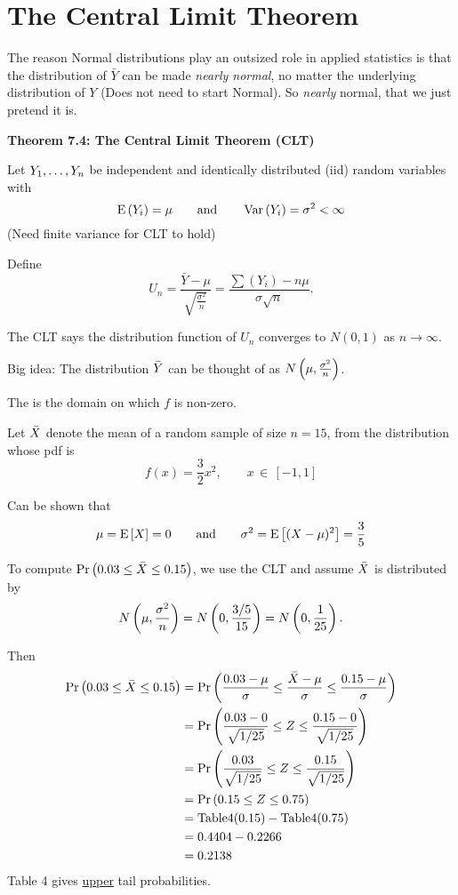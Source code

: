 \section{The Central Limit Theorem}

The reason Normal distributions play an outsized role in applied statistics is that the distribution of  $\bar{Y}$ can be made \emph{nearly normal}, no matter the underlying distribution of $Y$ (Does not need to start  Normal). So \emph{nearly} normal, that we just pretend it is.



\nnl \textbf{Theorem 7.4: The Central Limit Theorem (CLT)}

\nl Let $Y_1, \dots, Y_n$ be independent and identically distributed (iid) random variables with
$$\E{Y_i} = \mu \wideand \Var{Y_i} = \sigma^2 < \infty$$
(Need finite variance for CLT to hold)

\nl Define $$U_n = \frac{\bar{Y}-\mu}{\sqrt{\frac{\sigma^2}{n}}} = \frac{\sum (Y_i) - n\mu}{\sigma \sqrt{n}}.$$

\nl The CLT says the distribution function of
$U_n$ converges to $N(0,1)$ as $n\to\infty$.

\nl Big idea: The distribution $\bar{Y}$ can be thought of as $\normalDist{\mu}{\frac{\sigma^2}{n}}$.

 The  is the domain on which $f$ is non-zero.

\example* Let $\bar{X}$ denote the mean of a random sample of size $n=15$, from the distribution whose pdf is $$f(x) = \frac{3}{2}x^2, \qquad x \,\in\, [-1,1]$$


\nl Can be shown that
$$\mu = \Eb{X} = 0 \wideand \sigma^2 = \Eb{(X-\mu)^2} = \frac{3}{5}$$

\nl To compute $\P{0.03 \leq \Xbar \leq 0.15}$, we use the CLT and assume $\bar{X}$ is distributed  by
$$\normalDist{\mu}{\frac{\sigma^2}{n}} = \normalDist{0}{\frac{3/5}{15}} = \normalDist{0}{\over{25}}.$$

\nl Then
\begin{align}
    \P{0.03 \leq \bar{X} \leq 0.15} &= \P{\frac{0.03-\mu}{\sigma} \leq \frac{\Xbar - \mu}{\sigma} \leq \frac{0.15-\mu}{\sigma}} \notag\\
    &= \P{\frac{0.03-0}{\sqrt{1/25}} \leq Z \leq \frac{0.15-0}{\sqrt{1/25}}} \notag\\
    &= \P{\frac{0.03}{\sqrt{1/25}} \leq Z \leq \frac{0.15}{\sqrt{1/25}}} \notag\\
    &= \P{0.15\leq Z \leq 0.75} \notag\\
    &= \text{Table4}(0.15) - \text{Table4}(0.75)\notag\\
    &= 0.4404 - 0.2266 \notag\\
    &= 0.2138 \notag
\end{align}
\recall Table 4 gives \underline{upper} tail probabilities.

